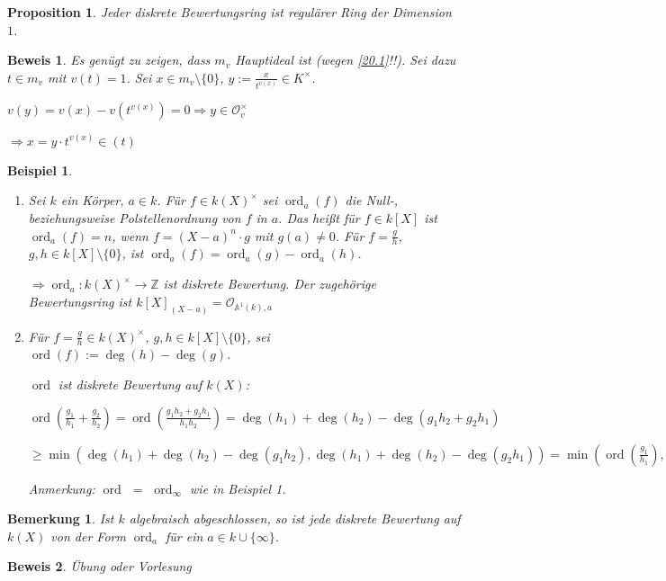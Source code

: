 \documentclass[a4paper, 12pt, numbers=noendperiod, chapterprefix=true, headsepline]{scrbook}
\theoremstyle{break}
\newtheorem{Bem}[Def]{Bemerkung}
\newtheorem{Prop}[Def]{Proposition}
\theoremstyle{nonumberbreak}
\newtheorem{nnBsp}{Beispiel}
\newtheorem{Bew}{Beweis}
\theoremstyle{nonumberplain}
\newcommand{\quot}[1]{\textrm{\glqq}{#1}\textrm{\grqq}}
\DeclareMathOperator{\ord}{ord}
\newcommand{\Z}{\mathbb{Z}}
\newcommand{\A}{\mathbb{A}}
\newcommand{\calO}{\mathcal{O}}
\begin{document}
\begin{Prop}
Jeder diskrete Bewertungsring ist regul\"arer Ring der Dimension $1$.
\end{Prop}

\begin{Bew}
Es gen\"ugt zu zeigen, dass $m_v$ Hauptideal ist (wegen \ref{20.1}!!). Sei dazu $t\in m_v$ mit $v(t)=1$. Sei $x\in m_v\setminus\{0\}$, $y:=\frac{x}{t^{v(x)}}\in K^\times$.

$v(y)=v(x)-v(t^{v(x)})=0\Rightarrow y\in \calO_v^\times$

$\Rightarrow x=y\cdot t^{v(x)}\in(t)$
\end{Bew}

\begin{nnBsp}\begin{enumerate}[1)]
\item
Sei $k$ ein K\"orper, $a\in k$. F\"ur $f\in k(X)^\times$ sei $\ord_a(f)$ die Null-, beziehungsweise Polstellenordnung von $f$ in $a$. Das hei\ss t f\"ur $f\in k[X]$ ist $\ord_a(f)=n$, wenn $f=(X-a)^n\cdot g$ mit $g(a)\ne0$. F\"ur $f=\frac{g}{h}$, $g,h\in k[X]\setminus\{0\}$, ist $\ord_a(f)=\ord_a(g)-\ord_a(h)$.

$\Rightarrow \ord_a:k(X)^\times\to\Z$ ist diskrete Bewertung. Der zugeh\"orige Bewertungsring ist $k[X]_{(X-a)}=\calO_{\A^1(k),a}$
\item
	F\"ur $f=\frac{g}{h}\in k(X)^\times$, $g,h\in k[X]\setminus\{0\}$, sei $\ord(f):=\deg(h)-\deg(g)$.
	
	$\ord$ ist diskrete Bewertung auf $k(X)$:
	
	$\ord(\frac{g_1}{h_1}+\frac{g_2}{h_2})=\ord(\frac{g_1h_2+g_2h_1}{h_1h_2})=\deg(h_1)+\deg(h_2)-\deg(g_1h_2+g_2h_1)$
	
	$\ge \min(\deg(h_1)+\deg(h_2)-\deg(g_1h_2), \deg(h_1)+\deg(h_2)-\deg(g_2h_1))=\min(\ord(\frac{g_1}{h_1}),\ord(\frac{g_2}{h_2}))$
	
	\emph{Anmerkung:} $\ord$ \quot{$=$} $\ord_\infty$ wie in Beispiel 1.
\end{enumerate}\end{nnBsp}

\begin{Bem}
Ist $k$ algebraisch abgeschlossen, so ist jede diskrete Bewertung auf $k(X)$ von der Form $\ord_a$ f\"ur ein $a\in k\cup\{\infty\}$.
\end{Bem}

\begin{Bew}
\"Ubung oder Vorlesung
\end{Bew}
\end{document}
